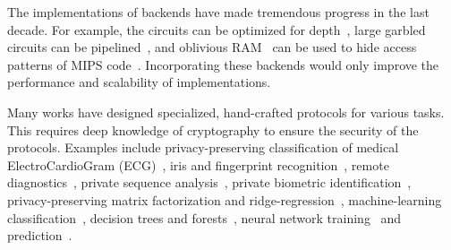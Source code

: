 The implementations of \mpc backends  have made  tremendous progress in the last decade.
For example, the circuits can be optimized for depth~\cite{ddkssz15,cbmcgcdepth}, large garbled circuits can be pipelined~\cite{yao-pipe}, and oblivious RAM~\cite{oram1,oram2} can be used to hide access patterns of MIPS code~\cite{mips}. Incorporating these backends would only improve the performance and scalability of \tool implementations.

Many works have designed specialized, hand-crafted protocols for various \mpc tasks. 
This requires deep knowledge of cryptography
to ensure the security of the protocols.
Examples include privacy-preserving classification of medical ElectroCardioGram (ECG)~\cite{barni}, iris and fingerprint recognition~\cite{blanton}, remote diagnostics~\cite{brickell}, private sequence analysis~\cite{franz}, private biometric identification~\cite{huang}, privacy-preserving matrix factorization and ridge-regression~\cite{valeriaMatrix, valeriaRidge}, machine-learning classification~\cite{shafindss}, decision trees and forests~\cite{wu}, neural network training~\cite{secureml} and prediction~\cite{minionn}.
